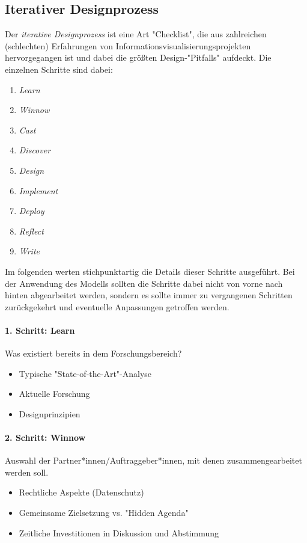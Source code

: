 \subsection{Iterativer Designprozess}
Der \emph{iterative Designprozess} ist eine Art "Checklist", die aus zahlreichen (schlechten) Erfahrungen von Informationsvisualisierungsprojekten hervorgegangen ist und dabei die größten Design-"Pitfalls" aufdeckt. Die einzelnen Schritte sind dabei:
\begin{enumerate}
	\item \emph{Learn}
	\item \emph{Winnow}
	\item \emph{Cast}
	\item \emph{Discover}
	\item \emph{Design}
	\item \emph{Implement}
	\item \emph{Deploy}
	\item \emph{Reflect}
	\item \emph{Write}
\end{enumerate}
Im folgenden werten stichpunktartig die Details dieser Schritte ausgeführt. Bei der Anwendung des Modells sollten die Schritte dabei nicht von vorne nach hinten abgearbeitet werden, sondern es sollte immer zu vergangenen Schritten zurückgekehrt und eventuelle Anpassungen getroffen werden.

\paragraph{1. Schritt: Learn}
Was existiert bereits in dem Forschungsbereich?
\begin{itemize}
	\item Typische "State-of-the-Art"-Analyse
	\item Aktuelle Forschung
	\item Designprinzipien
\end{itemize}

\paragraph{2. Schritt: Winnow}
Auswahl der Partner*innen/Auftraggeber*innen, mit denen zusammengearbeitet werden soll.
\begin{itemize}
	\item Rechtliche Aspekte (Datenschutz)
	\item Gemeinsame Zielsetzung vs. "Hidden Agenda"
	\item Zeitliche Investitionen in Diskussion und Abstimmung
\end{itemize}

